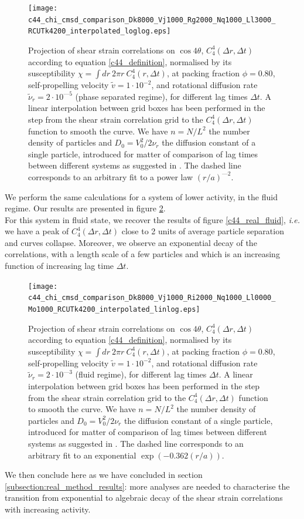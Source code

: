 \documentclass[class=report, float=false, crop=false]{standalone}
\begin{document}
\begin{figure}[H]
\centering
\texttt{[image: c44\_chi\_cmsd\_comparison\_Dk8000\_Vj1000\_Rg2000\_Nq1000\_Ll3000\_RCUTk4200\_interpolated\_loglog.eps]}
\caption{Projection of shear strain correlations on $\cos4\theta$, $C_4^4(\Delta r, \Delta t)$ according to equation \ref{c44_definition}, normalised by its susceptibility $\chi = \int dr~ 2 \pi r~ C_4^4(r, \Delta t)$, at packing fraction $\phi = 0.80$, self-propelling velocity $\tilde{v} = 1\cdot10^{-2}$, and rotational diffusion rate $\tilde{\nu}_r = 2\cdot10^{—5}$ (phase separated regime), for different lag times $\Delta t$. A linear interpolation between grid boxes has been performed in the step from the shear strain correlation grid to the $C_4^4(\Delta r, \Delta t)$ function to smooth the curve. We have $n = N/L^2$ the number density of particles and $D_0 = V_0^2/2\nu_r$ the diffusion constant of a single particle, introduced for matter of comparison of lag times between different systems as suggested in \cite{illing2016strain}. The dashed line corresponds to an arbitrary fit to a power law $(r/a)^{—2}$.}
\label{c44_cmsd_high}
\end{figure}

We perform the same calculations for a system of lower activity, in the fluid regime. Our results are presented in figure \ref{c44_cmsd_low}.\\

For this system in fluid state, we recover the results of figure \ref{c44_real_fluid}, \textit{i.e.} we have a peak of $C_4^4(\Delta r, \Delta t)$ close to 2 units of average particle separation and curves collapse. Moreover, we observe an exponential decay of the correlations, with a length scale of a few particles and which is an increasing function of increasing lag time $\Delta t$.

\begin{figure}[H]
\centering
\texttt{[image: c44\_chi\_cmsd\_comparison\_Dk8000\_Vj1000\_Ri2000\_Nq1000\_Ll0000\_Mo1000\_RCUTk4200\_interpolated\_linlog.eps]}
\caption{Projection of shear strain correlations on $\cos4\theta$, $C_4^4(\Delta r, \Delta t)$ according to equation \ref{c44_definition}, normalised by its susceptibility $\chi = \int dr~ 2 \pi r~ C_4^4(r, \Delta t)$, at packing fraction $\phi = 0.80$, self-propelling velocity $\tilde{v} = 1\cdot10^{-2}$, and rotational diffusion rate $\tilde{\nu}_r = 2\cdot10^{—3}$ (fluid regime), for different lag times $\Delta t$. A linear interpolation between grid boxes has been performed in the step from the shear strain correlation grid to the $C_4^4(\Delta r, \Delta t)$ function to smooth the curve. We have $n = N/L^2$ the number density of particles and $D_0 = V_0^2/2\nu_r$ the diffusion constant of a single particle, introduced for matter of comparison of lag times between different systems as suggested in \cite{illing2016strain}. The dashed line corresponds to an arbitrary fit to an exponential $\exp(-0.362(r/a))$.}
\label{c44_cmsd_low}
\end{figure}

We then conclude here as we have concluded in section \ref{subsection:real_method_results}: more analyses are needed to characterise the transition from exponential to algebraic decay of the shear strain correlations with increasing activity.
\end{document}
